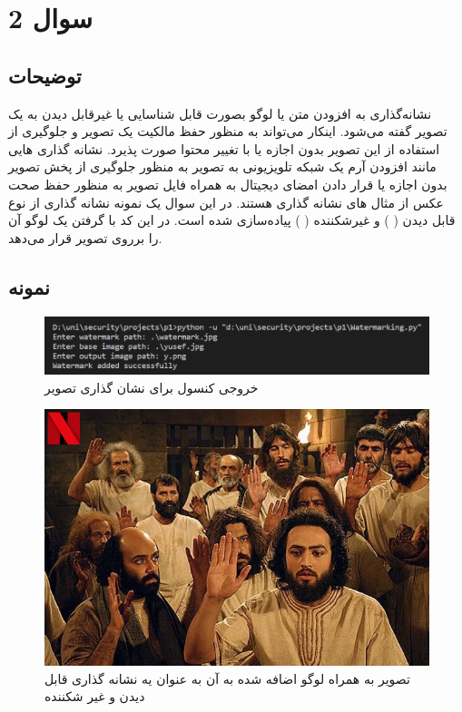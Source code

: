 \section{سوال 2}

\subsection{توضیحات}
نشانه‌گذاری به افزودن متن یا لوگو بصورت قابل شناسایی یا غیرقابل دیدن به یک تصویر گفته می‌شود. اینکار می‌تواند به منظور حفظ مالکیت یک تصویر و جلوگیری از استفاده از این تصویر بدون اجازه یا با تغییر محتوا صورت پذیرد.
نشانه گذاری هایی مانند افزودن آرم یک شبکه تلویزیونی به تصویر به منظور  جلوگیری از پخش تصویر بدون اجازه یا قرار دادن امضای دیجیتال به همراه فایل تصویر به منظور حفظ صحت عکس از مثال های نشانه گذاری هستند.
در این سوال یک نمونه نشانه گذاری از نوع قابل دیدن (
)
و غیرشکننده 
(  ) 
 پیاده‌سازی شده است. در این کد با گرفتن یک لوگو آن را برروی تصویر قرار می‌دهد.













\subsection{نمونه}


\begin{figure}[h!]
    \centering
    \includegraphics[width=0.5\linewidth]{images/set_watermark.png}
    \caption{خروجی کنسول برای نشان گذاری تصویر}
    \label{fig:watermark}
\end{figure}

\begin{figure}[h!]
    \centering
    \includegraphics[width=0.5\linewidth]{images/y.png}
    \caption{تصویر به همراه لوگو اضافه شده به آن به عنوان یه نشانه گذاری قابل دیدن و غیر شکننده}
    \label{fig:dynamicprogramming}
\end{figure}

